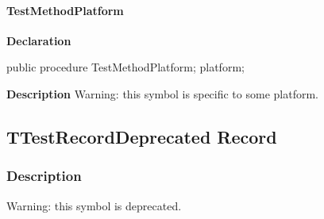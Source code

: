 \documentclass{report}
\newif\ifpdf
\begin{document}
\paragraph*{TestMethodPlatform}\hspace*{\fill}

\label{ok_hint_directives.TTestClassDeprecated-TestMethodPlatform}
\begin{list}{}{
\setlength{\itemindent}{0cm}
\setlength{\listparindent}{0cm}
\setlength{\leftmargin}{\evensidemargin}
\addtolength{\leftmargin}{\tmplength}
\settowidth{\labelsep}{X}
\addtolength{\leftmargin}{\labelsep}
\setlength{\labelwidth}{\tmplength}
}
\item[\textbf{Declaration}\hfill]
\ifpdf
\begin{flushleft}
\fi
\begin{ttfamily}
public procedure TestMethodPlatform; platform;\end{ttfamily}

\ifpdf
\end{flushleft}
\fi

\par
\item[\textbf{Description}]
Warning: this symbol is specific to some platform.

 

\end{list}
\ifpdf
\subsection*{\large{\textbf{TTestRecordDeprecated Record}}\normalsize\hspace{1ex}\hrulefill}
\else
\subsection*{TTestRecordDeprecated Record}
\fi
\label{ok_hint_directives.TTestRecordDeprecated}
\subsubsection*{\large{\textbf{Description}}\normalsize\hspace{1ex}\hfill}
Warning: this symbol is deprecated.
\end{document}
